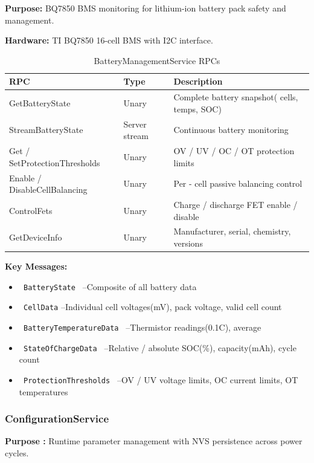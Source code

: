 \textbf{Purpose:} BQ7850 BMS monitoring for lithium-ion battery pack safety and management.

\textbf{Hardware:} TI BQ7850 16-cell BMS with I2C interface.

\begin{table}[H]
\centering
\caption{BatteryManagementService RPCs}
\label{tab:battery-rpcs}
\begin{tabular} { | l | l | p{6cm} |}
\hline
\textbf{RPC} & \textbf{Type} & \textbf{Description}
\\
\hline GetBatteryState &Unary &Complete battery snapshot(
    cells, temps, SOC) \\
StreamBatteryState &Server stream &Continuous battery
        monitoring \\
Get
        / SetProtectionThresholds &Unary &OV / UV / OC
        / OT protection limits \\
Enable / DisableCellBalancing &Unary &Per
    - cell passive balancing control \\
ControlFets &Unary &Charge
          / discharge FET enable / disable \\
GetDeviceInfo &Unary &Manufacturer,
    serial, chemistry, versions \\
\hline
\end{tabular}
\end{table}

\textbf{Key Messages:}
\begin{itemize}[leftmargin = 1.5em, topsep = 4pt, itemsep = 2pt]
    \item \texttt {
  BatteryState
}
--Composite of all battery data
    \item \texttt { CellData}
--Individual cell voltages(mV), pack voltage, valid cell count
    \item \texttt {
  BatteryTemperatureData
}
--Thermistor readings(0.1\textdegree C), average
    \item \texttt {
  StateOfChargeData
}
--Relative / absolute SOC(\%), capacity(mAh), cycle count
    \item \texttt {
  ProtectionThresholds
}
--OV / UV voltage limits, OC current limits, OT temperatures
\end{itemize}

\subsubsection{ConfigurationService}

\textbf{Purpose :
} Runtime parameter management with NVS persistence across power cycles.

